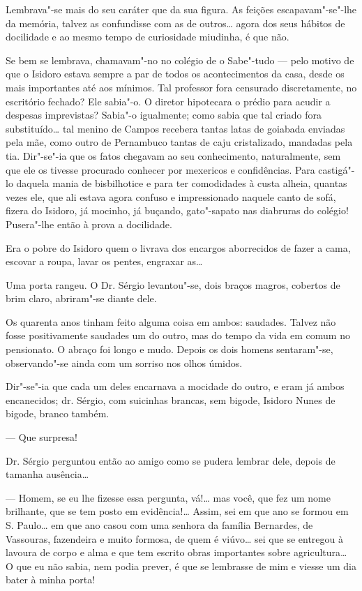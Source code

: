 Lembrava"-se mais do seu caráter que da sua figura. As feições
escapavam"-se"-lhe da memória, talvez as confundisse com as de outros\ldots{}
agora dos seus hábitos de docilidade e ao mesmo tempo de curiosidade
miudinha, é que não.

Se bem se lembrava, chamavam"-no no colégio de o Sabe"-tudo --- pelo
motivo de que o Isidoro estava sempre a par de todos os acontecimentos
da casa, desde os mais importantes até aos mínimos. Tal professor fora
censurado discretamente, no escritório fechado? Ele sabia"-o. O diretor
hipotecara o prédio para acudir a despesas imprevistas? Sabia"-o
igualmente; como sabia que tal criado fora substituído\ldots{} tal menino de
Campos recebera tantas latas de goiabada enviadas pela mãe, como outro
de Pernambuco tantas de caju cristalizado, mandadas pela tia. Dir"-se"-ia
que os fatos chegavam ao seu conhecimento, naturalmente, sem que ele os
tivesse procurado conhecer por mexericos e confidências. Para castigá"-lo
daquela mania de bisbilhotice e para ter comodidades à custa alheia,
quantas vezes ele, que ali estava agora confuso e impressionado naquele
canto de sofá, fizera do Isidoro, já mocinho, já buçando, gato"-sapato
nas diabruras do colégio! Pusera"-lhe então à prova a docilidade.

Era o pobre do Isidoro quem o livrava dos encargos aborrecidos de fazer
a cama, escovar a roupa, lavar os pentes, engraxar as\ldots{}

Uma porta rangeu. O Dr. Sérgio levantou"-se, dois braços magros, cobertos
de brim claro, abriram"-se diante dele.

Os quarenta anos tinham feito alguma coisa em ambos: saudades. Talvez
não fosse positivamente saudades um do outro, mas do tempo da vida em
comum no pensionato. O abraço foi longo e mudo. Depois os dois homens
sentaram"-se, observando"-se ainda com um sorriso nos olhos úmidos.

Dir"-se"-ia que cada um deles encarnava a mocidade do outro, e eram já
ambos encanecidos; dr. Sérgio, com suicinhas brancas, sem bigode,
Isidoro Nunes de bigode, branco também.

--- Que surpresa!

Dr. Sérgio perguntou então ao amigo como se pudera lembrar dele, depois
de tamanha ausência\ldots{}

--- Homem, se eu lhe fizesse essa pergunta, vá!\ldots{} mas você, que fez um
nome brilhante, que se tem posto em evidência!\ldots{} Assim, sei em que ano
se formou em S. Paulo\ldots{} em que ano casou com uma senhora da família
Bernardes, de Vassouras, fazendeira e muito formosa, de quem é viúvo\ldots{}
sei que se entregou à lavoura de corpo e alma e que tem escrito obras
importantes sobre agricultura\ldots{} O que eu não sabia, nem podia prever, é
que se lembrasse de mim e viesse um dia bater à minha porta!

